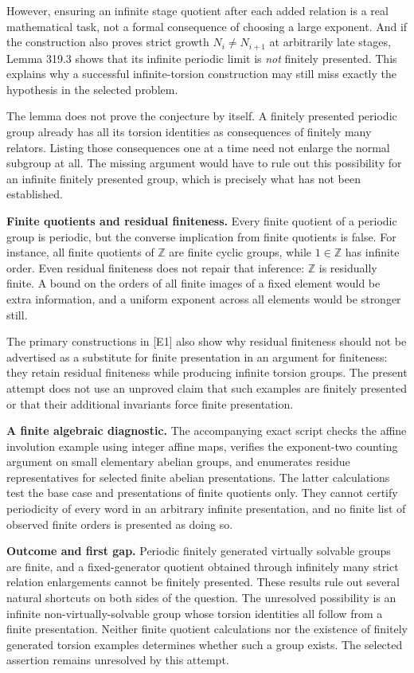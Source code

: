 \documentclass[11pt]{article}
\begin{document}
However, ensuring an infinite stage quotient after each added relation is a real mathematical task, not a formal consequence of choosing a large exponent. And if the construction also proves strict growth $N_i\ne N_{i+1}$ at arbitrarily late stages, Lemma 319.3 shows that its infinite periodic limit is \emph{not} finitely presented. This explains why a successful infinite-torsion construction may still miss exactly the hypothesis in the selected problem.

The lemma does not prove the conjecture by itself. A finitely presented periodic group already has all its torsion identities as consequences of finitely many relators. Listing those consequences one at a time need not enlarge the normal subgroup at all. The missing argument would have to rule out this possibility for an infinite finitely presented group, which is precisely what has not been established.

\textbf{Finite quotients and residual finiteness.} Every finite quotient of a periodic group is periodic, but the converse implication from finite quotients is false. For instance, all finite quotients of $\mathbb Z$ are finite cyclic groups, while $1\in\mathbb Z$ has infinite order. Even residual finiteness does not repair that inference: $\mathbb Z$ is residually finite. A bound on the orders of all finite images of a fixed element would be extra information, and a uniform exponent across all elements would be stronger still.

The primary constructions in [E1] also show why residual finiteness should not be advertised as a substitute for finite presentation in an argument for finiteness: they retain residual finiteness while producing infinite torsion groups. The present attempt does not use an unproved claim that such examples are finitely presented or that their additional invariants force finite presentation.

\textbf{A finite algebraic diagnostic.} The accompanying exact script checks the affine involution example using integer affine maps, verifies the exponent-two counting argument on small elementary abelian groups, and enumerates residue representatives for selected finite abelian presentations. The latter calculations test the base case and presentations of finite quotients only. They cannot certify periodicity of every word in an arbitrary infinite presentation, and no finite list of observed finite orders is presented as doing so.

\textbf{Outcome and first gap.} Periodic finitely generated virtually solvable groups are finite, and a fixed-generator quotient obtained through infinitely many strict relation enlargements cannot be finitely presented. These results rule out several natural shortcuts on both sides of the question. The unresolved possibility is an infinite non-virtually-solvable group whose torsion identities all follow from a finite presentation. Neither finite quotient calculations nor the existence of finitely generated torsion examples determines whether such a group exists. The selected assertion remains unresolved by this attempt.
\end{document}
